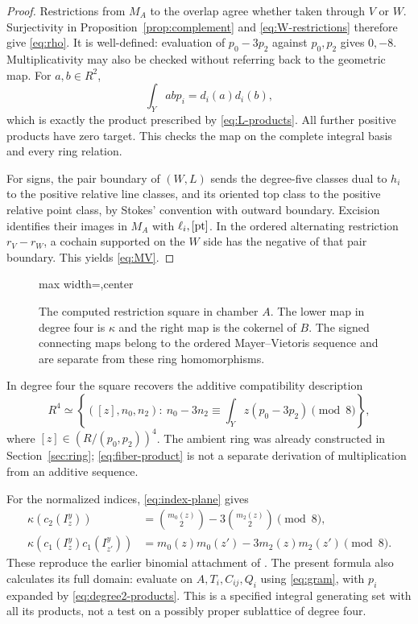 \begin{proof}
Restrictions from $M_A$ to the overlap agree whether taken
through $V$ or $W$. Surjectivity in
Proposition~\ref{prop:complement} and
\eqref{eq:W-restrictions} therefore give \eqref{eq:rho}.
It is well-defined: evaluation of $p_0-3p_2$ against
$p_0,p_2$ gives $0,-8$. Multiplicativity may also be checked
without referring back to the geometric map. For $a,b\in R^2$,
\[
 \int_Yabp_i=d_i(a)d_i(b),
\]
which is exactly the product prescribed by
\eqref{eq:L-products}. All further positive products have
zero target. This checks the map on the complete integral
basis and every ring relation.

For signs, the pair boundary of $(W,L)$ sends the degree-five
classes dual to $h_i$ to the positive relative line classes,
and its oriented top class to the positive relative point
class, by Stokes' convention with outward boundary. Excision
identifies their images in $M_A$ with $\ell_i,[\mathrm{pt}]$.
In the ordered alternating restriction $r_V-r_W$, a
cochain supported on the $W$ side has the negative of that
pair boundary. This yields \eqref{eq:MV}.
\end{proof}

\begin{figure}[htbp]
\centering
\begin{adjustbox}{max width=\textwidth,center}

\end{adjustbox}
\caption{The computed restriction square in chamber $A$.
The lower map in degree four is $\kappa$ and the right map
is the cokernel of $B$. The signed connecting maps belong
to the ordered Mayer--Vietoris sequence and are separate
from these ring homomorphisms.}
\label{fig:excision}
\end{figure}

In degree four the square recovers the additive compatibility
description
\begin{equation}\label{eq:fiber-product}
 R^4\simeq
 \left\{([z],n_0,n_2):\ n_0-3n_2\equiv
          \int_Yz(p_0-3p_2)\pmod8\right\},
\end{equation}
where $[z]\in(R/(p_0,p_2))^4$. The ambient ring was already
constructed in Section~\ref{sec:ring};
\eqref{eq:fiber-product} is not a separate derivation of
multiplication from an additive sequence.

For the normalized indices, \eqref{eq:index-plane} gives
\begin{equation}\label{eq:index-kappa}
 \begin{aligned}
 \kappa(c_2(I_z^y))&=\binom{m_0(z)}2-3\binom{m_2(z)}2\pmod8,\\
 \kappa(c_1(I_z^y)c_1(I_{z'}^y))
     &=m_0(z)m_0(z')-3m_2(z)m_2(z')\pmod8.
 \end{aligned}
\end{equation}
These reproduce the earlier binomial attachment of
\cite[\S6.4]{wuebben17}. The present formula also calculates
its full domain: evaluate on $A,T_i,C_{ij},Q_i$ using
\eqref{eq:gram}, with $p_i$ expanded by
\eqref{eq:degree2-products}. This is a specified integral
generating set with all its products, not a test on a
possibly proper sublattice of degree four.

